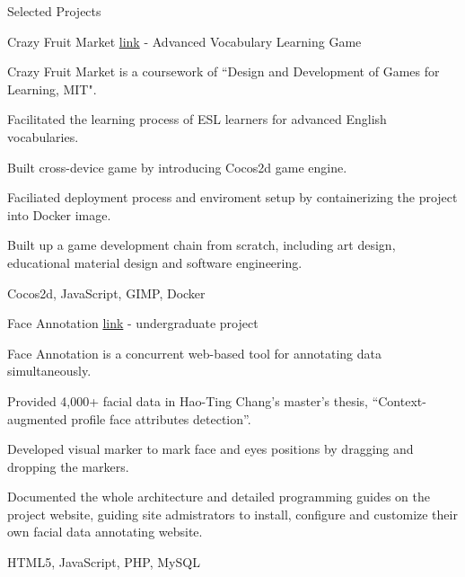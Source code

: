 \documentclass{cv}
\begin{document}
\pagebreak


\begin{cvSection}{Selected Projects}

\begin{projectSubsection}{Crazy Fruit Market  \href{http://jasson15.github.io/crazy-fruit-market}{link}}{ - }{Advanced Vocabulary Learning Game}

\item Crazy Fruit Market is a coursework of “Design and Development of Games for Learning, MIT".
\item Facilitated the learning process of ESL learners for advanced English vocabularies.
\item Built cross-device game by introducing Cocos2d game engine.
\item Faciliated deployment process and enviroment setup by containerizing the project into Docker image.
\item Built up a game development chain from scratch, including art design, educational material design and software engineering.
\item Cocos2d, JavaScript, GIMP, Docker

\end{projectSubsection}

\begin{projectSubsection}{Face Annotation \href{http://cmlab.csie.ntu.edu.tw/~pi/face_annotation}{link}}{ - }{undergraduate project}

\item Face Annotation is a concurrent web-based tool for annotating data simultaneously.
\item Provided 4,000+ facial data in Hao-Ting Chang's master's thesis, “Context-augmented profile face attributes detection”.
\item Developed visual marker to mark face and eyes positions by dragging and dropping the markers. 
\item Documented the whole architecture and detailed programming guides on the project website, guiding site admistrators to install, configure and customize their own facial data annotating website. 
\item HTML5, JavaScript, PHP, MySQL


\end{projectSubsection}
\end{cvSection}
\end{document}
